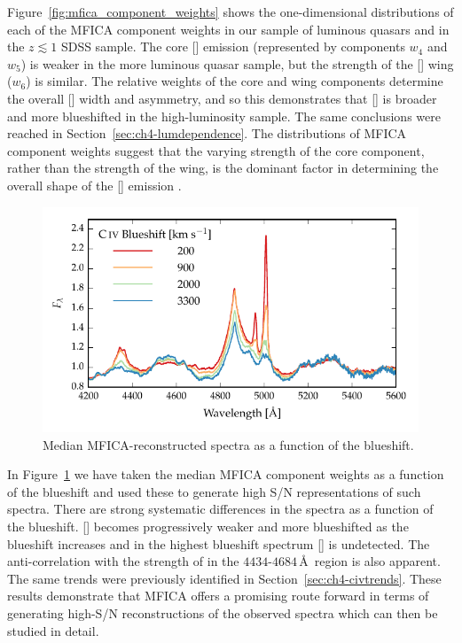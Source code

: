Figure~\ref{fig:mfica_component_weights} shows the one-dimensional distributions of each of the MFICA component weights in our sample of luminous quasars and in the $z \lesssim 1$ SDSS sample.
The core [] emission (represented by components $w_4$ and $w_5$) is weaker in the more luminous quasar sample, but the strength of the [] wing ($w_6$) is similar.
The relative weights of the core and wing components determine the overall [] width and asymmetry, and so this demonstrates that [] is broader and more blueshifted in the high-luminosity sample.
The same conclusions were reached in Section~\ref{sec:ch4-lumdependence}.
The distributions of MFICA component weights suggest that the varying strength of the core component, rather than the strength of the wing, is the dominant factor in determining the overall shape of the [] emission \citep[e.g.][]{shen14}.

\begin{figure}
    \centering
    \includegraphics[width=\columnwidth]{figures/chapter04/mfica_composites.pdf}
    \caption[{Median MFICA-reconstructed spectra as a function of the  blueshift.}]{Median MFICA-reconstructed spectra as a function of the  blueshift.}
    \label{fig:mfica_composites}
\end{figure}

In Figure~\ref{fig:mfica_composites} we have taken the median MFICA component weights as a function of the  blueshift and used these to generate high S/N representations of such spectra.
There are strong systematic differences in the spectra as a function of the  blueshift.
[] becomes progressively weaker and more blueshifted as the  blueshift increases and in the highest  blueshift spectrum [] is undetected.
The anti-correlation with the strength of  in the $4434$-$4684$\,\AA\, region is also apparent.
The same trends were previously identified in Section~\ref{sec:ch4-civtrends}.
These results demonstrate that MFICA offers a promising route forward in terms of generating high-S/N reconstructions of the observed spectra which can then be studied in detail.

